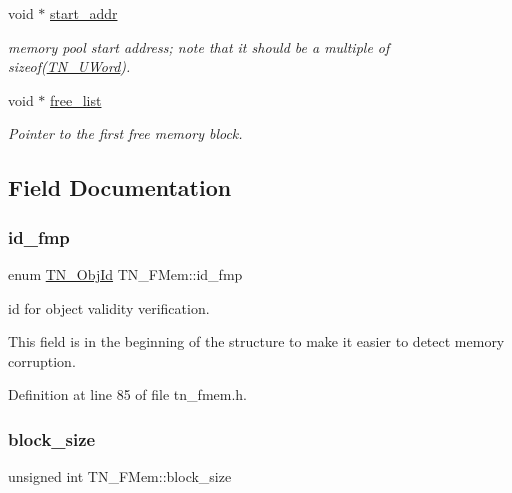 \begin{DoxyCompactItemize}
void $\ast$ \hyperlink{structTN__FMem_a7eac768da37c99efd90ae56ebde527cf}{start\+\_\+addr}
\begin{DoxyCompactList}\small\item\em memory pool start address; note that it should be a multiple of {\ttfamily sizeof(\hyperlink{tn__arch__example_8h_ab80cba0fe9ffcd9011d53dfeb9e39bf4}{T\+N\+\_\+\+U\+Word})}. \end{DoxyCompactList}\item 
void $\ast$ \hyperlink{structTN__FMem_a00ffa3c416a57946d95ab8814168eedb}{free\+\_\+list}
\begin{DoxyCompactList}\small\item\em Pointer to the first free memory block. \end{DoxyCompactList}\end{DoxyCompactItemize}


\subsection{Field Documentation}
\mbox{\label{structTN__FMem_aee1235a605f90d80ec16547ea647eaff}} 
\subsubsection{\texorpdfstring{id\+\_\+fmp}{id\_fmp}}
{\footnotesize\ttfamily enum \hyperlink{tn__common_8h_ae779dd1f6735f6e139fb70acd004d976}{T\+N\+\_\+\+Obj\+Id} T\+N\+\_\+\+F\+Mem\+::id\+\_\+fmp}



id for object validity verification. 

This field is in the beginning of the structure to make it easier to detect memory corruption. 

Definition at line 85 of file tn\+\_\+fmem.\+h.

\mbox{\label{structTN__FMem_a101e3e0eeb2774309a55ed1d6cad8e3f}} 
\subsubsection{\texorpdfstring{block\+\_\+size}{block\_size}}
{\footnotesize\ttfamily unsigned int T\+N\+\_\+\+F\+Mem\+::block\+\_\+size}



